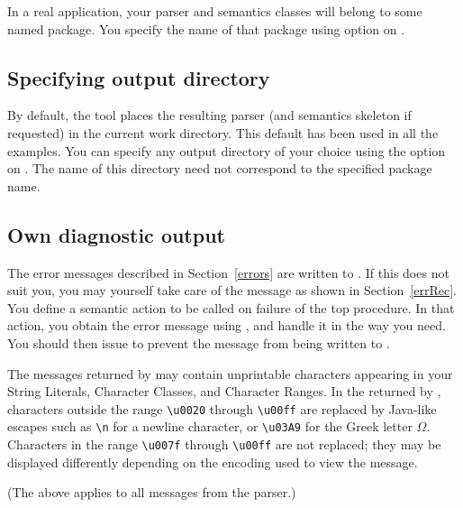 In a real application, your parser and semantics classes will belong to some
named package.
You specify the name of that package using option  on 
.
\subsection{Specifying output directory}

By default, the  tool places the resulting parser
(and semantics skeleton if requested) in the current work directory.
This default has been used in all the examples.
You can specify any output directory of your choice using the 
option on .
The name of this directory need not correspond to the specified package name.

\subsection{Own diagnostic output}

The error messages described in Section~\ref{errors}
are written to .
If this does not suit you, you may yourself take care of the message
as shown in Section~\ref{errRec}.
You define a semantic action to be called on failure of the top procedure.
In that action, you obtain the error message using ,
and handle it in the way you need.
You should then issue  to prevent the message from
being written to .

The messages returned by  may contain unprintable
characters appearing in your String Literals, Character Classes, and Character Ranges.
In the  returned by ,
characters outside the range \verb#\u0020# through \verb#\u00ff#
are replaced by Java-like
escapes such as \verb#\n# for a newline character, 
or \verb#\u03A9# for the Greek letter $\Omega$.
Characters in the range \verb#\u007f# through \verb#\u00ff# are not replaced;
they may be displayed differently depending on the encoding used to view the message.

(The above applies to all messages from the parser.)


